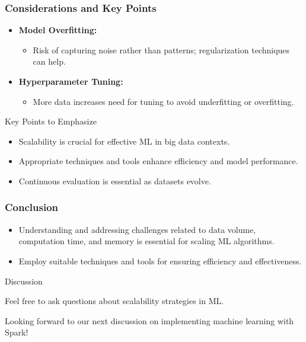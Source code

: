 \documentclass[aspectratio=169]{beamer}
\begin{document}
\begin{frame}
    \frametitle{Considerations and Key Points}
    \begin{itemize}
        \item \textbf{Model Overfitting:}
            \begin{itemize}
                \item Risk of capturing noise rather than patterns; regularization techniques can help.
            \end{itemize}
        \item \textbf{Hyperparameter Tuning:}
            \begin{itemize}
                \item More data increases need for tuning to avoid underfitting or overfitting.
            \end{itemize}
    \end{itemize}

    \begin{block}{Key Points to Emphasize}
        \begin{itemize}
            \item Scalability is crucial for effective ML in big data contexts.
            \item Appropriate techniques and tools enhance efficiency and model performance.
            \item Continuous evaluation is essential as datasets evolve.
        \end{itemize}
    \end{block}
\end{frame}

\begin{frame}
    \frametitle{Conclusion}
    \begin{itemize}
        \item Understanding and addressing challenges related to data volume, computation time, and memory is essential for scaling ML algorithms.
        \item Employ suitable techniques and tools for ensuring efficiency and effectiveness.
    \end{itemize}
    
    \begin{block}{Discussion}
        \item Feel free to ask questions about scalability strategies in ML.
        \item Looking forward to our next discussion on implementing machine learning with Spark!
    \end{block}
\end{frame}
\end{document}
